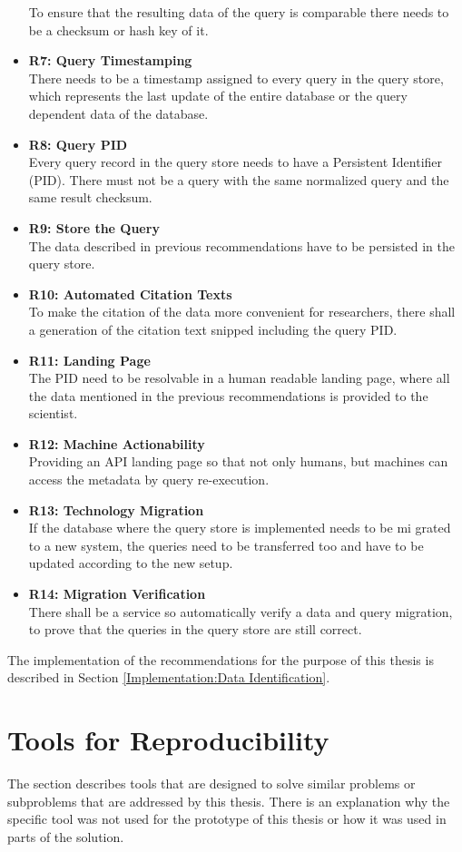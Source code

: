 \documentclass[draft,final]{vutinfth} %
\begin{document}
\begin{itemize}
	To ensure that the resulting data of the query is comparable there needs to be a checksum or hash key of it. 
	\item \textbf{R7: Query Timestamping} \\
	There needs to be a timestamp assigned to every query in the query store, which represents the last update of the entire database or the query dependent data of the database.
	\item \textbf{R8: Query PID}\\
	Every query record in the query store needs to have a Persistent Identifier (PID). There must not be a query with the same normalized query and the same result checksum. 
	\item \textbf{R9: Store the Query} \\
	The data described in previous recommendations have to be persisted in the query store.
	\item \textbf{R10: Automated Citation Texts} \\
	To make the citation of the data more convenient for researchers, there shall a generation of the citation text snipped including the query PID.
	\item \textbf{R11: Landing Page} \\
	The PID need to be resolvable in a human readable landing page, where all the data mentioned in the previous recommendations is provided to the scientist.
	\item \textbf{R12: Machine Actionability} \\
	Providing an API landing page so that not only humans, but machines can access the metadata by query re-execution.
	\item \textbf{R13: Technology Migration} \\
	If the database where the query store is implemented needs to be mi grated to a new system, the queries need to be transferred too and have to be updated according to the new setup.
	\item \textbf{R14: Migration Verification} \\
	There shall be a service so automatically verify a data and query migration, to prove that the queries in the query store are still correct. 
\end{itemize}
The implementation of the recommendations for the purpose of this thesis is described in Section \ref{Implementation:Data Identification}. 

\section{Tools for Reproducibility}\label{Existing Tools}
The section describes tools that are designed to solve similar problems or subproblems that are addressed by this thesis. There is an explanation why the specific tool was not used for the prototype of this thesis or how it was used in parts of the solution. 
\end{document}
